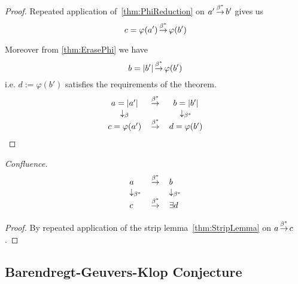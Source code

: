 {\begin{lemma}
\begin{proof}
            Repeated application of~\ref{thm:PhiReduction} on $a' {\,\stackrel{\beta^*}{\to}\,}
            b'$ gives us
            $$
            c = \varphi(a') {\,\stackrel{\beta^*}{\to}\,} \varphi(b')
            $$

            Moreover from \ref{thm:ErasePhi} we have
            $$
            b = |b'| {\,\stackrel{\beta^*}{\to}\,} \varphi(b')
            $$
            i.e. $d := \varphi(b')$ satisfies the requirements of the theorem.
            $$
            \begin{array}{ccc}
                a = |a'| & {\,\stackrel{\beta^*}{\to}\,} & b = |b'|
                \\
                \downarrow_\beta & & \downarrow_{\beta^*}
                \\
                c = \varphi(a') & {\,\stackrel{\beta^*}{\to}\,} &  d = \varphi(b')
            \end{array}
            $$
        \end{proof}
    \end{lemma}




    \begin{theorem}
        \label{thm:Confluence}
        \emph{Confluence.}
        $$
        \begin{array}{lll}
            a & {\,\stackrel{\beta^*}{\to}\,} & b
            \\
            \downarrow_{\beta^*} & & \downarrow_{\beta^*}
            \\
            c & {\,\stackrel{\beta^*}{\to}\,} & \exists d
        \end{array}
        $$

        \begin{proof}
            By repeated application of the strip lemma~\ref{thm:StripLemma} on
            $a {\,\stackrel{\beta^*}{\to}\,} c$.
        \end{proof}
    \end{theorem}



}







\subsection{Barendregt-Geuvers-Klop Conjecture}


